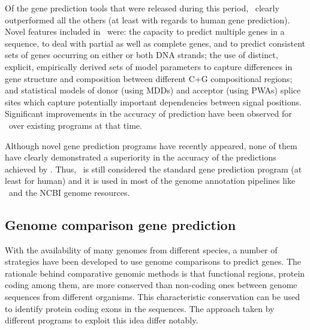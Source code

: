 Of the gene prediction tools that were released during this period,
\genscan\ clearly outperformed all the others (at least with regards
to human gene prediction). Novel features included in \genscan\ were:
the capacity to predict multiple genes in a sequence, to deal with
partial as well as complete genes, and to predict consistent sets of
genes occurring on either or both DNA strands; the use of distinct,
explicit, empirically derived sets of model parameters to capture
differences in gene structure and composition between different C+G
compositional regions; and statistical models of donor (using MDDs)
and acceptor (using PWAs) splice sites which capture potentially
important dependencies between signal positions. Significant
improvements in the accuracy of prediction have been observed for
\genscan\ over existing programs at that time.


Although novel gene prediction programs have recently appeared, none
of them have clearly demonstrated a superiority in the accuracy of the
predictions achieved by \genscan. Thus, \genscan\ is still considered
the standard gene prediction program (at least for human) and it is
used in most of the genome annotation pipelines like \ensembl\ and the
NCBI genome resources.

\subsection{Genome comparison gene prediction}
\label{comparative section}

With the availability of many genomes from different species, a number
of strategies have been developed to use genome comparisons to predict
genes. The rationale behind comparative genomic methods is that
functional regions, protein coding among them, are more conserved than
non-coding ones between genome sequences from different organisms.
This characteristic conservation can be used to identify protein
coding exons in the sequences. The approach taken by different
programs to exploit this idea differ notably.

